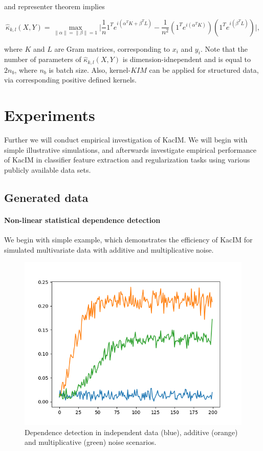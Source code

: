 \documentclass{article}
\begin{document}
and representer theorem\cite{?} implies 

\begin{equation}
\label{eq:kernel_estimator1}
    \hat{\kappa}_{k,l} (X,Y) = \max_{\|\alpha\| = \|\beta\| = 1} \vert \frac{1}{n} 1^{T} e^{i(\alpha^{T} K + \beta^{T} L)} - \frac{1}{n^2} (1^{T} e^{i(\alpha^{T}K)}) (1^{T} e^{i(\beta^{T}L)}) \vert,
\end{equation}

where $K$ and $L$ are Gram matrices, corresponding to $x_{i}$ and $y_{i}$. Note that the number of parameters of $\hat{\kappa}_{k,l} (X,Y)$ is dimension-idnependent and is equal to $2n_{b}$, where $n_{b}$ is batch size. Also, kernel-$KIM$ can be applied for structured data, via corresponding positive defined kernels.

\section{Experiments}
\label{section:experiments}

Further we will conduct empirical investigation of KacIM. We will begin with simple illustrative simulations, and afterwards investigate empirical performance of KacIM in classifier feature extraction and regularization tasks using various publicly available data sets.

\subsection{Generated data}

\paragraph{Non-linear statistical dependence detection} We begin with simple example, which demonstrates the efficiency of KacIM for simulated multivariate data with additive and multiplicative noise.

\begin{figure}[t]
\label{fig:experiments_simulation}
\centering
\includegraphics[scale=0.35]{../experiments/basic_demonstration/dependence_detection.png}
\caption{Dependence detection in independent data (blue), additive (orange) and multiplicative (green) noise scenarios.}
\end{figure}
\end{document}
